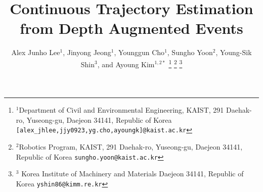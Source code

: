 \documentclass[letterpaper, 10 pt, conference]{ieeeconf}  %
\begin{document}
\title{\LARGE \bf
	Continuous Trajectory Estimation from Depth Augmented Events
}

\author{Alex Junho Lee$^{1}$, Jinyong Jeong$^{1}$, Younggun Cho$^{1}$, Sungho Yoon$^{2}$, Young-Sik Shin$^{3}$, and Ayoung Kim${}^{1,2*}$
	\thanks{$^{1}$Department of Civil and Environmental Engineering,
		\acs{KAIST}, 291 Daehak-ro, Yuseong-gu, Daejeon 34141, Republic of Korea
		{\tt\small [alex\_jhlee,jjy0923,yg.cho,ayoungk]@kaist.ac.kr}}%
	\thanks{$^{2}$Robotics Program,
		\acs{KAIST}, 291 Daehak-ro, Yuseong-gu, Daejeon 34141, Republic of Korea
		{\tt\small sungho.yoon@kaist.ac.kr}}%
	\thanks{$^{3}$ Korea Institute of Machinery and Materials
		Daejeon 34141, Republic of Korea
		{\tt\small yshin86@kimm.re.kr}}%
}


\maketitle

\thispagestyle{empty}
\pagestyle{empty}









%

\end{document}
